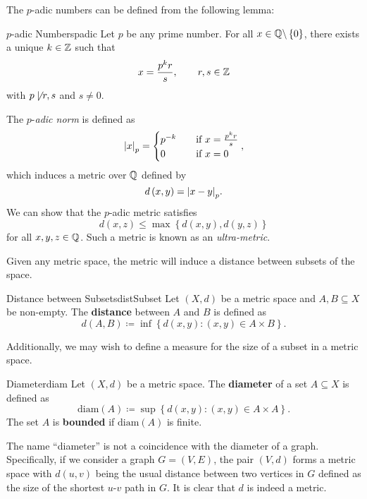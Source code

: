 \documentclass[math]{amznotes}
\theoremstyle{remark}
\begin{document}
The $p$-adic numbers can be defined from the following lemma:
\begin{lembox}{$p$-adic Numbers}{padic}
    Let $p$ be any prime number. For all $x \in \mathbb{Q} \backslash \left\{0\right\}$, there exists a unique $k \in \mathbb{Z}$ such that
    \begin{equation*}
        x = \frac{p^kr}{s}, \qquad r, s \in \mathbb{Z}
    \end{equation*}
    with $p \not\mid r, s$ and $s \neq 0$.
\end{lembox}
The $p$-\textit{adic norm} is defined as 
\begin{equation*}
    {\left\lvert {x} \right\rvert}_p = \begin{cases}
        p^{-k} & \quad\textrm{if } x = \frac{p^kr}{s} \\
        0 & \quad\textrm{if } x = 0
    \end{cases},
\end{equation*}
which induces a metric over $\mathbb{Q}$ defined by 
\begin{equation*}
    d\left(x, y\right) ={\left\lvert {x - y} \right\rvert}_p.
\end{equation*}
We can show that the $p$-adic metric satisfies 
\begin{equation*}
    d\left(x, z\right) \leq \max\left\{d\left(x, y\right), d\left(y, z\right)\right\}
\end{equation*}
for all $x, y, z \in \mathbb{Q}$. Such a metric is known as an \textit{ultra-metric}.

Given any metric space, the metric will induce a distance between subsets of the space.
\begin{dfnbox}{Distance between Subsets}{distSubset}
    Let $\left(X, d\right)$ be a metric space and $A, B \subseteq X$ be non-empty. The {\color{red} \textbf{distance}} between $A$ and $B$ is defined as 
    \begin{equation*}
        d\left(A, B\right) \coloneqq \inf \left\{d\left(x, y\right) \colon \left(x, y\right) \in A \times B\right\}.
    \end{equation*}
\end{dfnbox}
Additionally, we may wish to define a measure for the size of a subset in a metric space.
\begin{dfnbox}{Diameter}{diam}
    Let $\left(X, d\right)$ be a metric space. The {\color{red} \textbf{diameter}} of a set $A \subseteq X$ is defined as 
    \begin{equation*}
        \mathrm{diam}\left(A\right) \coloneqq \sup\left\{d\left(x, y\right) \colon \left(x, y\right) \in A \times A\right\}.
    \end{equation*}
    The set $A$ is {\color{red} \textbf{bounded}} if $\mathrm{diam}\left(A\right)$ is finite.
\end{dfnbox}
The name ``diameter'' is not a coincidence with the diameter of a graph. Specifically, if we consider a graph $G = \left(V, E\right)$, the pair $\left(V, d\right)$ forms a metric space with $d\left(u, v\right)$ being the usual distance between two vertices in $G$ defined as the size of the shortest $u$-$v$ path in $G$. It is clear that $d$ is indeed a metric.
\end{document}
